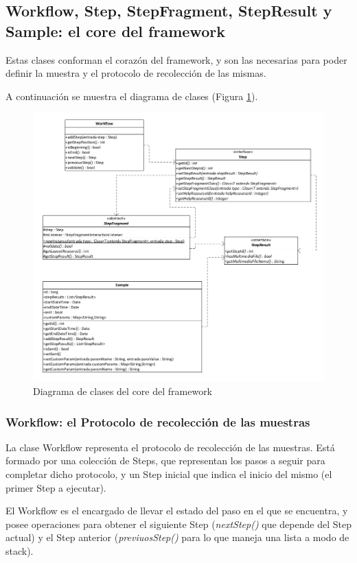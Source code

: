 \subsection{Workflow, Step, StepFragment, StepResult y Sample: el core del framework}
Estas clases conforman el corazón del framework, y son las necesarias para poder definir la muestra y el protocolo de recolección de las mismas.

A continuación se muestra el diagrama de clases (Figura \ref{fig:umlFrameworkCore}).

\begin{figure}[H]
  \centering
    \includegraphics[scale=0.4]{05-implementacion/FrameworkCore.png} 
   \caption{Diagrama de clases del core del framework}
   \label{fig:umlFrameworkCore}
\end{figure}


\subsubsection{Workflow: el Protocolo de recolección de las muestras}
La clase Workflow representa el protocolo de recolección de las muestras. Está formado por una colección de Steps, que representan los pasos a seguir para completar dicho protocolo, y un Step inicial que indica el inicio del mismo (el primer Step a ejecutar).

El Workflow es el encargado de llevar el estado del paso en el que se encuentra, y posee operaciones para obtener el siguiente Step (\textit{nextStep()}  que depende del Step actual) y el Step anterior (\textit{previuosStep()}  para lo que maneja una lista a modo de stack).

